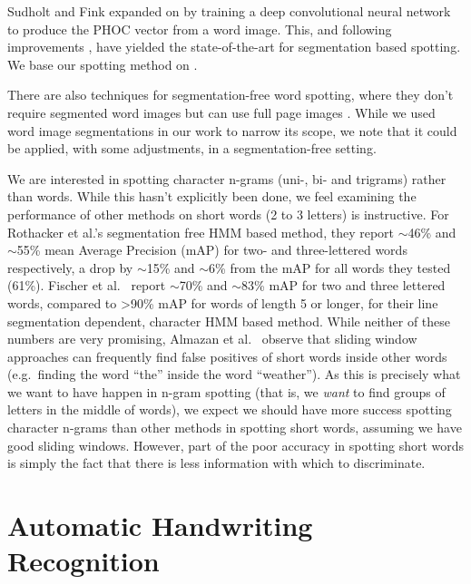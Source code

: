 \documentclass[ms,electronic,twosidetoc,letterpaper,chaptercenter,parttop,lol,lof,lot]{byumsphd}
\begin{document}
Sudholt and Fink \cite{sudholt2016} expanded on \cite{Almazan2014} by training a deep convolutional neural network to produce the PHOC vector from a word image. This, and following improvements \cite{krishnan2016, retsinasTrans2017}, have yielded the state-of-the-art for segmentation based spotting. We base our spotting method on \cite{sudholt2016}.

There are also techniques for segmentation-free word spotting, where they don't require segmented word images but can use full page images \cite{wilkinson2017}. While we used word image segmentations in our work to narrow its scope, we note that it could be applied, with some adjustments, in a segmentation-free setting.

We are interested in spotting character n-grams (uni-, bi- and trigrams) rather than words. While this hasn't explicitly been done, we feel examining the performance of other methods on short words (2 to 3 letters) is instructive. For Rothacker et al.'s \cite{Rothacker2013} segmentation free HMM based method, they report $\sim$46\% and $\sim$55\% mean Average Precision (mAP) for two- and three-lettered words respectively, a drop by $\sim$15\% and $\sim$6\% from the mAP for all words they tested (61\%). Fischer et al.~\cite{Fischer2012} report $\sim$70\% and $\sim$83\% mAP for two and three lettered words, compared to {\textgreater}90\% mAP for words of length 5 or longer, for their line segmentation dependent, character HMM based method. While neither of these numbers are very promising, Almazan et al.~\cite{Almazan2012} observe that sliding window approaches can frequently find false positives of short words inside other words (e.g.~finding the word ``the'' inside the word ``weather''). As this is precisely what we want to have happen in n-gram spotting (that is, we \textit{want} to find groups of letters in the middle of words), we expect we should have more success spotting character n-grams than other methods in spotting short words, assuming we have good sliding windows. However, part of the poor accuracy in spotting short words is simply the fact that there is less information with which to discriminate.%


\section{Automatic Handwriting Recognition}
\end{document}
